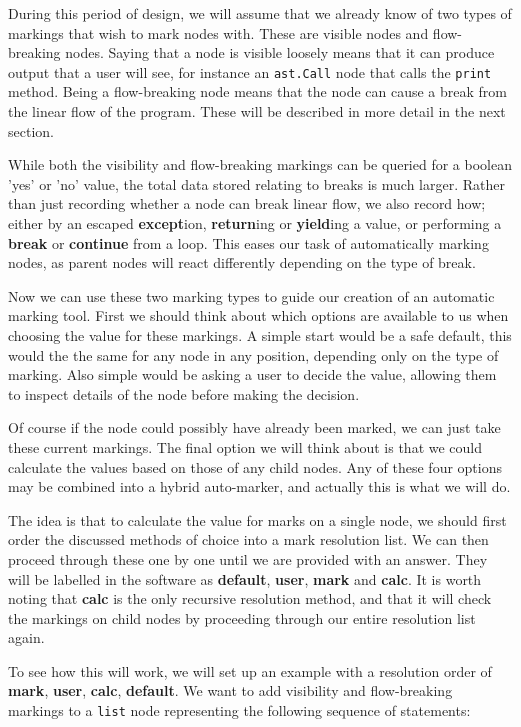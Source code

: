 \documentclass[twoside,a4paper]{report}
\begin{document}
During this period of design, we will assume that we already know of two types of markings that wish to mark nodes with. These are visible nodes
and flow-breaking nodes. Saying that a node is visible loosely means that it can produce output that a user will see, for instance an \texttt{ast.Call}
node that calls the \texttt{print} method. Being a flow-breaking node means that the node can cause a break from the linear flow of the program. These
will be described in more detail in the next section.

While both the visibility and flow-breaking markings can be queried for a boolean 'yes' or 'no' value, the total data stored relating to breaks is much
larger. Rather than just recording whether a node can break linear flow, we also record how; either by an escaped \textbf{except}ion,
\textbf{return}ing or \textbf{yield}ing a value, or performing a \textbf{break} or \textbf{continue} from a loop. This eases our task of automatically
marking nodes, as parent nodes will react differently depending on the type of break.

Now we can use these two marking types to guide our creation of an automatic marking tool. First we should think about which options are available
to us when choosing the value for these markings. A simple start would be a safe default, this would the the same for any node in any position,
depending only on the type of marking. Also simple would be asking a user to decide the value, allowing them to inspect details of the node before
making the decision.

Of course if the node could possibly have already been marked, we can just take these current markings. The final option we will think about is
that we could calculate the values based on those of any child nodes. Any of these four options may be combined into a hybrid auto-marker, and actually
this is what we will do.

The idea is that to calculate the value for marks on a single node, we should first order the discussed methods of choice into a mark resolution
list. We can then proceed through these one by one until we are provided with an answer. They will be labelled in the software as
\textbf{default}, \textbf{user}, \textbf{mark} and \textbf{calc}. It is worth noting that \textbf{calc} is the only recursive resolution method,
and that it will check the markings on child nodes by proceeding through our entire resolution list again.

To see how this will work, we will set up an example with a resolution order of \textbf{mark}, \textbf{user}, \textbf{calc}, \textbf{default}.
We want to add visibility and flow-breaking markings to a \texttt{list} node representing the following sequence of statements:
\end{document}
